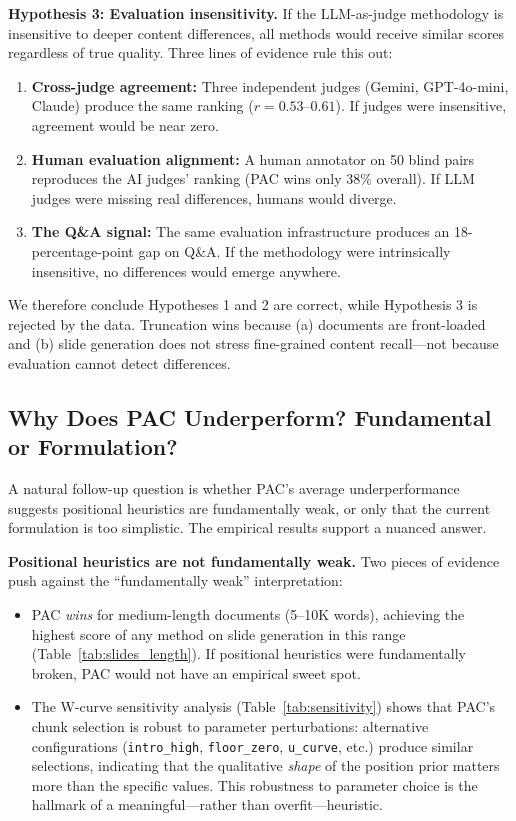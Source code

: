 \documentclass[journal]{IEEEtran}
\begin{document}
\textbf{Hypothesis 3: Evaluation insensitivity.} If the LLM-as-judge methodology is insensitive to deeper content differences, all methods would receive similar scores regardless of true quality. Three lines of evidence rule this out:
\begin{enumerate}
    \item \textbf{Cross-judge agreement:} Three independent judges (Gemini, GPT-4o-mini, Claude) produce the same ranking ($r = 0.53$--$0.61$). If judges were insensitive, agreement would be near zero.
    \item \textbf{Human evaluation alignment:} A human annotator on 50 blind pairs reproduces the AI judges' ranking (PAC wins only 38\% overall). If LLM judges were missing real differences, humans would diverge.
    \item \textbf{The Q\&A signal:} The same evaluation infrastructure produces an 18-percentage-point gap on Q\&A. If the methodology were intrinsically insensitive, no differences would emerge anywhere.
\end{enumerate}
We therefore conclude Hypotheses 1 and 2 are correct, while Hypothesis 3 is rejected by the data. Truncation wins because (a) documents are front-loaded and (b) slide generation does not stress fine-grained content recall---not because evaluation cannot detect differences.

\subsection{Why Does PAC Underperform? Fundamental or Formulation?}
\label{sec:why-pac}

A natural follow-up question is whether PAC's average underperformance suggests positional heuristics are fundamentally weak, or only that the current formulation is too simplistic. The empirical results support a nuanced answer.

\textbf{Positional heuristics are not fundamentally weak.} Two pieces of evidence push against the ``fundamentally weak'' interpretation:
\begin{itemize}
    \item PAC \textit{wins} for medium-length documents (5--10K words), achieving the highest score of any method on slide generation in this range (Table~\ref{tab:slides_length}). If positional heuristics were fundamentally broken, PAC would not have an empirical sweet spot.
    \item The W-curve sensitivity analysis (Table~\ref{tab:sensitivity}) shows that PAC's chunk selection is robust to parameter perturbations: alternative configurations (\texttt{intro\_high}, \texttt{floor\_zero}, \texttt{u\_curve}, etc.) produce similar selections, indicating that the qualitative \textit{shape} of the position prior matters more than the specific values. This robustness to parameter choice is the hallmark of a meaningful---rather than overfit---heuristic.
\end{itemize}
\end{document}
